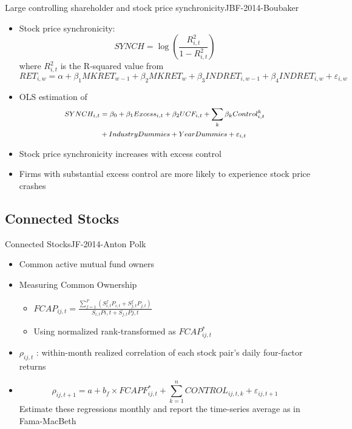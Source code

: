 \documentclass{beamer}
\begin{document}
	\begin{frame}{Large controlling shareholder and stock price synchronicity}{JBF-2014-Boubaker}
		\begin{itemize}
			\item Stock price synchronicity:
			\begin{equation*}
				SYNCH = \log(\frac{R^2_{i,t}}{1-R^2_{i,t}})
			\end{equation*}
			where $ R^2_{i,t} $ is the R-squared value from \footnotesize  $$ RET_{i,w} = \alpha + \beta_1 MKRET_{w-1} + \beta_2 MKRET_w + \beta_3 INDRET_{i,w-1} + \beta_4 INDRET_{i,w} + \varepsilon_{i,w} $$
			\normalsize  
			\item OLS estimation of 
			\begin{equation*}
				\footnotesize
				\begin{split}
					SYNCH_{i,t} & =  \beta_0 + \beta_1 Excess_{i,t} + \beta_2 UCF_{i,t} + \sum_k \beta_k Control^k_{i,t}\\
					& + IndustryDummies + YearDummies + \varepsilon_{i,t}
				\end{split}
			\end{equation*}
			
			\item Stock price synchronicity increases with excess control
			\item  Firms with substantial excess control are more likely to experience stock price crashes
			
		\end{itemize}
	\end{frame}
	
	\subsection{Connected Stocks}
	
	
	\begin{frame}{Connected Stocks}{JF-2014-Anton Polk}
		\begin{itemize}
			\item  Common active mutual fund owners
			\item  Measuring Common Ownership
			\begin{itemize}
				\item $ FCAP_{ij,t} = \frac{\sum_{f = 1}^{F} (S^f_{i,t}P_{i,t}+S^f_{j,t}P_{j,t})}{S_{i,t}P{i,t} + S_{j,t}P{j,t}} $
				\item Using normalized rank-transformed as $  FCAP_{ij,t} ^* $
			\end{itemize}
			\item $ \rho_{ij,t} $ :  within-month realized correlation of each stock pair’s daily four-factor returns 
			\item    \begin{equation*}
				\rho_{ij,t+1} = a + b_f \times FCAPF^*_{ij,t} + \sum_{k = 1}^{n } CONTROL_{ij,t,k} + \varepsilon_{ij,t+1}
				\label{e1}
			\end{equation*}
			Estimate these regressions monthly and report
			the time-series average as in Fama-MacBeth
			
		\end{itemize}
	\end{frame}
	
\end{document}
